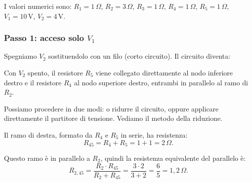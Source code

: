 \begin{esempio}
I valori numerici sono: \(R_1 = 1\,\Omega\), \(R_2 = 3\,\Omega\), \(R_3 = 1\,\Omega\), \(R_4 = 1\,\Omega\), \(R_5 = 1\,\Omega\), \(V_1 = 10\,\text{V}\), \(V_2 = 4\,\text{V}\).

\subsubsection*{Passo 1: acceso solo \(V_1\)}

Spegniamo \(V_2\) sostituendolo con un filo (corto circuito). Il circuito diventa:

\begin{center}
\end{center}

Con \(V_2\) spento, il resistore \(R_5\) viene collegato direttamente al nodo inferiore destro e il resistore \(R_4\) al nodo superiore destro, entrambi in parallelo al ramo di \(R_2\).

Possiamo procedere in due modi: o ridurre il circuito, oppure applicare direttamente il partitore di tensione. Vediamo il metodo della riduzione.

Il ramo di destra, formato da \(R_4\) e \(R_5\) in serie, ha resistenza:
\[
R_{45} = R_4 + R_5 = 1 + 1 = 2\,\Omega.
\]

Questo ramo è in parallelo a \(R_2\), quindi la resistenza equivalente del parallelo è:
\[
R_{2,45} = \frac{R_2 \cdot R_{45}}{R_2 + R_{45}} = \frac{3 \cdot 2}{3 + 2} = \frac{6}{5} = 1{,}2\,\Omega.
\]


\end{esempio}
